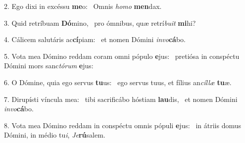 2. Ego dixi in excéssu \textbf{me}o: \ast\  Omnis \textit{ho}\textit{mo} \textbf{men}dax.\

3. Quid retríbuam \textbf{Dó}mino, \ast\  pro ómnibus, quæ retrí\textit{bu}\textit{it} \textbf{mi}hi?\

4. Cálicem salutáris ac\textbf{cí}piam: \ast\  et nomen Dómini \textit{in}\textit{vo}\textbf{cá}bo.\

5. Vota mea Dómino reddam coram omni pópulo \textbf{e}jus: \ast\  pretiósa in conspéctu Dómini mors sanc\textit{tó}\textit{rum} \textbf{e}jus:\

6. O Dómine, quia ego servus \textbf{tu}us: \ast\  ego servus tuus, et fílius an\textit{cíl}\textit{læ} \textbf{tu}æ.\

7. Dirupísti víncula mea: \dag\  tibi sacrificábo hóstiam \textbf{lau}dis, \ast\  et nomen Dómini \textit{in}\textit{vo}\textbf{cá}bo.\

8. Vota mea Dómino reddam in conspéctu omnis pópuli \textbf{e}jus: \ast\  in átriis domus Dómini, in médio tu\textit{i}, \textit{Je}\textbf{rú}salem.\

